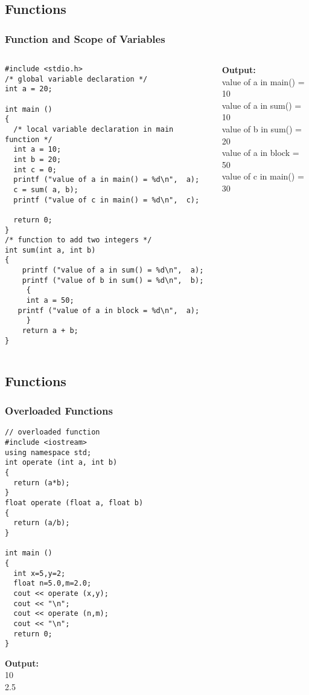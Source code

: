 \documentclass{beamer}
\newtheorem{Key points}{Key points}
\newcommand\Fontvia{\fontsize{6}{7.2}\selectfont}
\begin{document}
\subsection{Functions}
\begin{frame}[fragile]
\frametitle{Function and Scope of Variables}
\begin{columns}[onlytextwidth]
    \begin{column}{0.6\textwidth}
      \centering
\Fontvia
\begin{lstlisting}
#include <stdio.h>
/* global variable declaration */
int a = 20;
 
int main ()
{
  /* local variable declaration in main function */
  int a = 10;
  int b = 20;
  int c = 0;
  printf ("value of a in main() = %d\n",  a);
  c = sum( a, b);
  printf ("value of c in main() = %d\n",  c);

  return 0;
}
/* function to add two integers */
int sum(int a, int b)
{
    printf ("value of a in sum() = %d\n",  a);
    printf ("value of b in sum() = %d\n",  b);
     { 
     int a = 50;
   printf ("value of a in block = %d\n",  a);
     }
    return a + b;
}
\end{lstlisting}
    \end{column}
\pause    \begin{column}{0.4\textwidth}
      \centering
\textbf{{\color{blue}Output:}}\\ value of a in main() = 10\\
value of a in sum() = 10\\
value of b in sum() = 20\\
value of a in block = 50\\
value of c in main() = 30 
    \end{column}
\end{columns}
\end{frame}
\subsection{Functions}
\begin{frame}[fragile]

\frametitle{Overloaded Functions}
\Fontvia
\begin{lstlisting}
// overloaded function
#include <iostream>
using namespace std;
int operate (int a, int b)
{
  return (a*b);
}
float operate (float a, float b)
{
  return (a/b);
}

int main ()
{
  int x=5,y=2;
  float n=5.0,m=2.0;
  cout << operate (x,y);
  cout << "\n";
  cout << operate (n,m);
  cout << "\n";
  return 0;
}
\end{lstlisting}
\textbf{{\color{blue}Output:}}\\10\\2.5

\end{frame}
\end{document}
